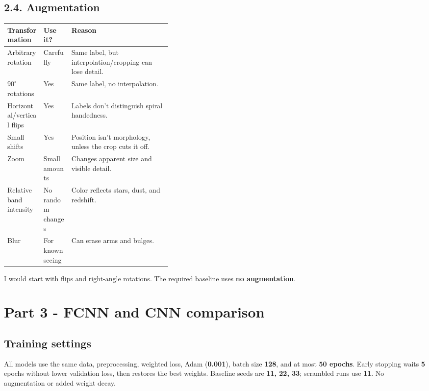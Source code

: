 \documentclass[11pt,a4paper]{article}
\begin{document}

\subsection*{2.4. Augmentation}

{\normalsize\setlength{\tabcolsep}{4pt}
\begin{tabularx}{\linewidth}{|p{0.22\linewidth}|p{0.17\linewidth}|L|}
\hline
{}
\textbf{Transformation} & \textbf{Use it?} & \textbf{Reason} \\ \hline
Arbitrary rotation & Carefully & Same label, but interpolation/cropping can lose detail. \\ \hline
$90^\circ$ rotations & Yes & Same label, no interpolation. \\ \hline
Horizontal/vertical flips & Yes & Labels don't distinguish spiral handedness. \\ \hline
Small shifts & Yes & Position isn't morphology, unless the crop cuts it off. \\ \hline
Zoom & Small amounts & Changes apparent size and visible detail. \\ \hline
Relative band intensity & No random changes & Color reflects stars, dust, and redshift. \\ \hline
Blur & For known seeing & Can erase arms and bulges. \\ \hline
\end{tabularx}\par}

I would start with flips and right-angle rotations. The required baseline uses \textbf{no augmentation}.


\section*{Part 3 - FCNN and CNN comparison}




\subsection*{Training settings}

All models use the same data, preprocessing, weighted loss, Adam (\textbf{0.001}), batch size \textbf{128}, and at most \textbf{50 epochs}. Early stopping waits \textbf{5} epochs without lower validation loss, then restores the best weights. Baseline seeds are \textbf{11, 22, 33}; scrambled runs use \textbf{11}. No augmentation or added weight decay.
\end{document}
